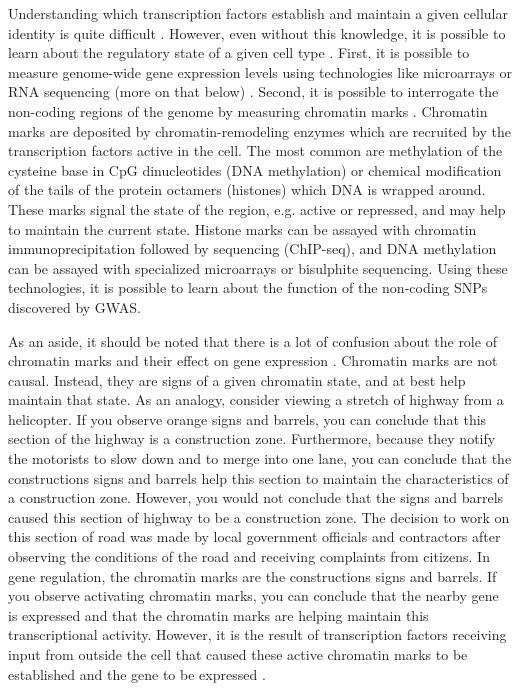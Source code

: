Understanding which transcription factors establish and maintain a
given cellular identity is quite difficult \citep{Vaquerizas2009, Biggin2011, Zaret2016}. However, even without this
knowledge, it is possible to learn about the regulatory state of a
given cell type \citep{Ho2014}. First, it is possible to measure genome-wide gene
expression levels using technologies like microarrays or RNA
sequencing (more on that below) \citep{Wang2009, Oshlack2010, Waern2011}. Second, it is possible to interrogate
the non-coding regions of the genome by measuring chromatin
marks \citep{Park2009, Landt2012}. Chromatin marks are deposited by chromatin-remodeling enzymes
which are recruited by the transcription factors active in the
cell. The most common are methylation of the cysteine base in CpG
dinucleotides (DNA methylation) or chemical modification of the tails
of the protein octamers (histones) which DNA is wrapped around. These
marks signal the state of the region, e.g. active or repressed, and may
help to maintain the current state. Histone marks can be assayed with
chromatin immunoprecipitation followed by sequencing (ChIP-seq), and
DNA methylation can be assayed with specialized microarrays or
bisulphite sequencing. Using these technologies, it is possible to
learn about the function of the non-coding SNPs discovered by GWAS.

As an aside, it should be noted that there is a lot of confusion about
the role of chromatin marks and their effect on gene
expression \citep{Henikoff2011}. Chromatin marks are not causal. Instead, they are signs of
a given chromatin state, and at best help maintain that state. As an
analogy, consider viewing a stretch of highway from a helicopter. If
you observe orange signs and barrels, you can conclude that this
section of the highway is a construction zone. Furthermore, because
they notify the motorists to slow down and to merge into one lane, you
can conclude that the constructions signs and barrels help this
section to maintain the characteristics of a construction
zone. However, you would not conclude that the signs and barrels
caused this section of highway to be a construction zone. The decision
to work on this section of road was made by local government officials
and contractors after observing the conditions of the road and
receiving complaints from citizens. In gene regulation, the chromatin
marks are the constructions signs and barrels. If you observe
activating chromatin marks, you can conclude that the nearby gene is
expressed and that the chromatin marks are helping maintain this
transcriptional activity. However, it is the result of transcription
factors receiving input from outside the cell that caused these active
chromatin marks to be established and the gene to be expressed \citep{Natoli2010}.

